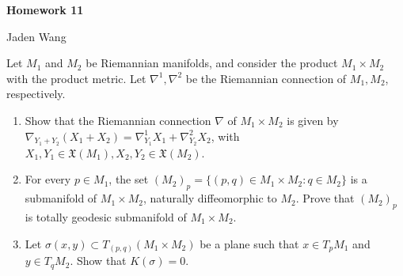 \documentclass[12pt]{article}
\begin{document}
\centerline {\textsf{\textbf{\LARGE{Homework 11}}}}
\centerline {Jaden Wang}
\vspace{.15in}
\begin{problem}[Do Carmo 6.1]
Let $ M_1$ and $ M_2$ be Riemannian manifolds, and consider the product $ M_1 \times M_2$ with the product metric. Let $ \nabla^{1}, \nabla^2$ be the Riemannian connection of $ M_1,M_2$, respectively.
\begin{enumerate}[label=(\alph*)]
	\item Show that the Riemannian connection $ \nabla$ of $ M_1 \times M_2$ is given by $ \nabla_{Y_1 + Y_2} (X_1+X_2) = \nabla_{Y_1}^{1} X_1 + \nabla_{Y_2}^2 X_2$, with $ X_1, Y_1 \in \mathfrak{X}(M_1), X_2, Y_2 \in \mathfrak{X}(M_2)$.
	\item For every $ p \in M_1$, the set $ (M_2)_p = \{(p,q) \in M_1 \times M_2: q \in M_2\} $ is a submanifold of $ M_1 \times M_2$, naturally diffeomorphic to $ M_2$. Prove that $ (M_2)_p$ is totally geodesic submanifold of $ M_1\times M_2$.
	\item Let $ \sigma(x,y) \subset T_{(p,q)} (M_1 \times M_2)$ be a plane such that $ x \in T_p M_1$ and $ y \in T_q M_2$. Show that $ K( \sigma) = 0$.
\end{enumerate}
\end{problem}
\end{document}
